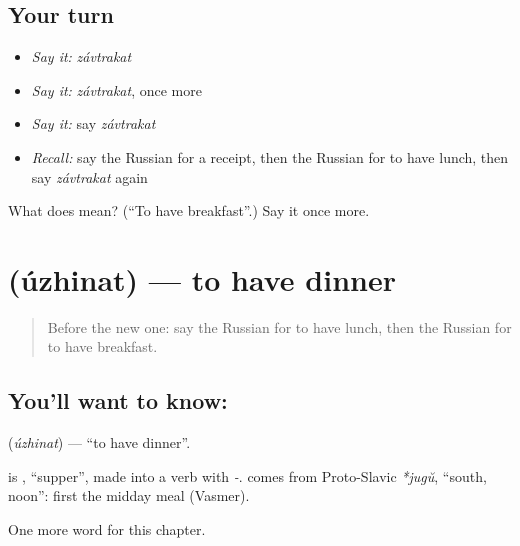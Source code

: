 \subsection*{Your turn}
\begin{itemize}
\raggedright
  \item \emph{Say it:} \emph{závtrakat}
  \item \emph{Say it:} \emph{závtrakat}, once more
  \item \emph{Say it:} say \emph{závtrakat}
  \item \emph{Recall:} say the Russian for a receipt, then the Russian for to have lunch, then say \emph{závtrakat} again
\end{itemize}

\begin{tcolorbox}[breakable,colback=teal!4,colframe=teal!35!black,title={Before you move on}]
What does  mean? (\textquotedblleft{}To have breakfast\textquotedblright{}.) Say it once more.
\end{tcolorbox}
\section[\texorpdfstring{\ru{ужинать} (úzhinat)}{ужинать (úzhinat)}]{ (úzhinat) — to have dinner}

\label{lesson:RU-C140-uzhinat}



\begin{quote}
Before the new one: say the Russian for to have lunch, then the Russian for to have breakfast.
\end{quote}

\subsection*{You'll want to know: }
\textbf{} (\emph{úzhinat}) — \textquotedblleft{}to have dinner\textquotedblright{}.

\begin{cousinweb}
\textbf{} is \emph{}, \textquotedblleft{}supper\textquotedblright{}, made into a verb with \emph{-}. \emph{} comes from Proto-Slavic \emph{*jugŭ}, \textquotedblleft{}south, noon\textquotedblright{}: first the midday meal (Vasmer).
\end{cousinweb}

\begin{grammarlens}[title={What you've built}]
One more word for this chapter.
\end{grammarlens}

